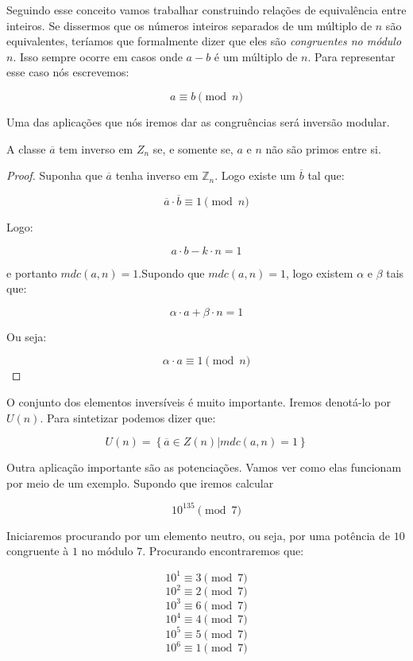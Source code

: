 Seguindo esse conceito vamos trabalhar construindo rela\c{c}\~oes de equival\^encia entre inteiros. Se dissermos que os n\'umeros inteiros separados de um m\'ultiplo de $n$ s\~ao equivalentes, ter\'iamos que formalmente dizer que eles s\~ao \textit{congruentes no m\'odulo $n$}. Isso sempre ocorre em casos onde $a-b$ \'e um m\'ultiplo de $n$. Para representar esse caso n\'os escrevemos:

$$a \equiv b \pmod{n}$$

Uma das aplica\c{c}\~oes que n\'os iremos dar as congru\^encias ser\'a invers\~ao modular. 

\begin{Th}\label{inversao}
A classe $\overline{a}$ tem inverso em $Z_n$ se, e somente se, $a$ e $n$ n\~ao s\~ao primos entre si.
\end{Th}

\begin{proof}
Suponha que $\overline{a}$ tenha inverso em $\mathbb{Z}_n$. Logo existe um $\overline{b}$ tal que:

$$\overline{a} \cdot \overline{b} \equiv 1 \pmod{n}$$

Logo:

$$a \cdot b - k \cdot n = 1 $$

e portanto $mdc(a,n) = 1$.Supondo que $mdc(a,n) = 1$, logo existem $\alpha$ e $\beta$ tais que:

$$\alpha \cdot a + \beta \cdot n = 1$$

Ou seja:

$$\alpha \cdot a \equiv 1 \pmod{n}$$
\end{proof}

O conjunto dos elementos invers\'iveis \'e muito importante. Iremos denot\'a-lo por $U(n)$. Para sintetizar podemos dizer que:

$$U(n) = \left\{\overline{a} \in Z(n) | mdc(a,n) = 1\right\}$$

Outra aplica\c{c}\~ao importante s\~ao as potencia\c{c}\~oes. Vamos ver como elas funcionam por meio de um exemplo. Supondo que iremos calcular

$$10^{135} \pmod{7}$$

Iniciaremos procurando por um elemento neutro, ou seja, por uma pot\^encia de $10$ congruente \`a $1$ no m\'odulo $7$. Procurando encontraremos que:

  $$10^1 \equiv 3 \pmod{7}$$  
	$$10^2 \equiv 2 \pmod{7}$$
	$$10^3 \equiv 6 \pmod{7}$$ 
	$$10^4 \equiv 4 \pmod{7}$$ 
	$$10^5 \equiv 5 \pmod{7}$$ 
	$$10^6 \equiv 1 \pmod{7}$$ 
	
